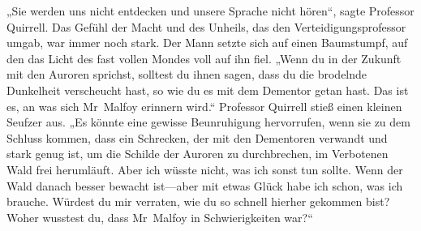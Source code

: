 „Sie werden uns nicht entdecken und unsere Sprache nicht hören“, sagte Professor Quirrell. Das Gefühl der Macht und des Unheils, das den Verteidigungsprofessor umgab, war immer noch stark. Der Mann setzte sich auf einen Baumstumpf, auf den das Licht des fast vollen Mondes voll auf ihn fiel. „Wenn du in der Zukunft mit den Auroren sprichst, solltest du ihnen sagen, dass du die brodelnde Dunkelheit verscheucht hast, so wie du es mit dem Dementor getan hast. Das ist es, an was sich Mr~Malfoy erinnern wird.“ Professor Quirrell stieß einen kleinen Seufzer aus. „Es könnte eine gewisse Beunruhigung hervorrufen, wenn sie zu dem Schluss kommen, dass ein Schrecken, der mit den Dementoren verwandt und stark genug ist, um die Schilde der Auroren zu durchbrechen, im Verbotenen Wald frei herumläuft. Aber ich wüsste nicht, was ich sonst tun sollte. Wenn der Wald danach besser bewacht ist—aber mit etwas Glück habe ich schon, was ich brauche. Würdest du mir verraten, wie du so schnell hierher gekommen bist? Woher wusstest du, dass Mr~Malfoy in Schwierigkeiten war?“

